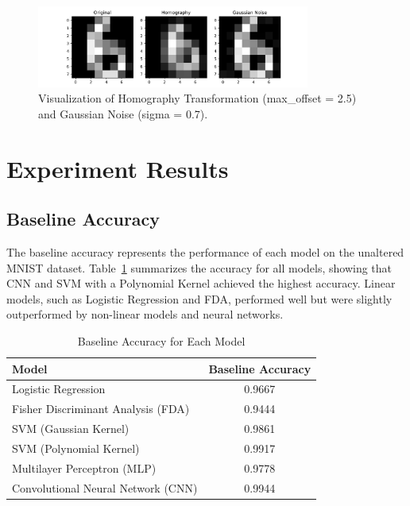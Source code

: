 \documentclass{article}
\begin{document}
\begin{figure}[h!]
    \centering
    \includegraphics[width=0.8\textwidth]{images/Experiment.pdf}
    \caption{Visualization of Homography Transformation (max\_offset = 2.5) and Gaussian Noise (sigma = 0.7).}
    \label{fig:experiment_visualization}
\end{figure}

\section{Experiment Results}

\subsection{Baseline Accuracy}
The baseline accuracy represents the performance of each model on the unaltered MNIST dataset. Table~\ref{tab:baseline_accuracy} summarizes the accuracy for all models, showing that CNN and SVM with a Polynomial Kernel achieved the highest accuracy. Linear models, such as Logistic Regression and FDA, performed well but were slightly outperformed by non-linear models and neural networks.

\begin{table}[h!]
    \centering
    \caption{Baseline Accuracy for Each Model}
    \label{tab:baseline_accuracy}
    \begin{tabular}{|l|c|}
        \hline
        \textbf{Model} & \textbf{Baseline Accuracy} \\ 
        \hline
        Logistic Regression & 0.9667 \\ 
        Fisher Discriminant Analysis (FDA) & 0.9444 \\ 
        SVM (Gaussian Kernel) & 0.9861 \\ 
        SVM (Polynomial Kernel) & 0.9917 \\ 
        Multilayer Perceptron (MLP) & 0.9778 \\ 
        Convolutional Neural Network (CNN) & 0.9944 \\ 
        \hline
    \end{tabular}
\end{table}
\end{document}
